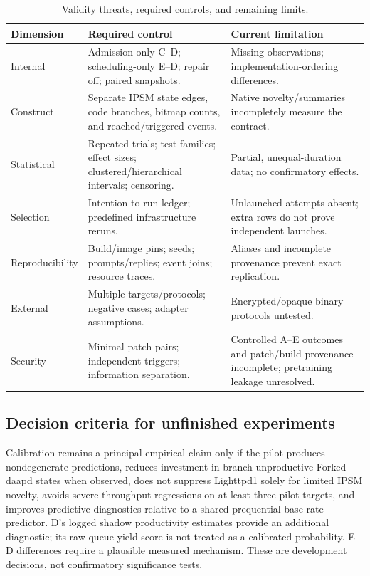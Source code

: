 \documentclass[final,5p,times,number]{elsarticle}
\begin{document}
\begin{table}[!tbp]
\centering\small
\caption{Validity threats, required controls, and remaining limits.}
\label{tab:threats}
\begin{tabularx}{\textwidth}{l Y Y}
\toprule
Dimension & Required control & Current limitation \\
\midrule
Internal & Admission-only C--D; scheduling-only E--D; repair off; paired snapshots. & Missing observations; implementation-ordering differences. \\
Construct & Separate IPSM state edges, code branches, bitmap counts, and reached/triggered events. & Native novelty/summaries incompletely measure the contract. \\
Statistical & Repeated trials; test families; effect sizes; clustered/hierarchical intervals; censoring. & Partial, unequal-duration data; no confirmatory effects. \\
Selection & Intention-to-run ledger; predefined infrastructure reruns. & Unlaunched attempts absent; extra rows do not prove independent launches. \\
Reproducibility & Build/image pins; seeds; prompts/replies; event joins; resource traces. & Aliases and incomplete provenance prevent exact replication. \\
External & Multiple targets/protocols; negative cases; adapter assumptions. & Encrypted/opaque binary protocols untested. \\
Security & Minimal patch pairs; independent triggers; information separation. & Controlled A--E outcomes and patch/build provenance incomplete; pretraining leakage unresolved. \\
\bottomrule
\end{tabularx}
\end{table}

\subsection{Decision criteria for unfinished experiments}
Calibration remains a principal empirical claim only if the pilot produces nondegenerate predictions, reduces investment in branch-unproductive Forked-daapd states when observed, does not suppress Lighttpd1 solely for limited IPSM novelty, avoids severe throughput regressions on at least three pilot targets, and improves predictive diagnostics relative to a shared prequential base-rate predictor. D's logged shadow productivity estimates provide an additional diagnostic; its raw queue-yield score is not treated as a calibrated probability. E--D differences require a plausible measured mechanism. These are development decisions, not confirmatory significance tests.
\end{document}
